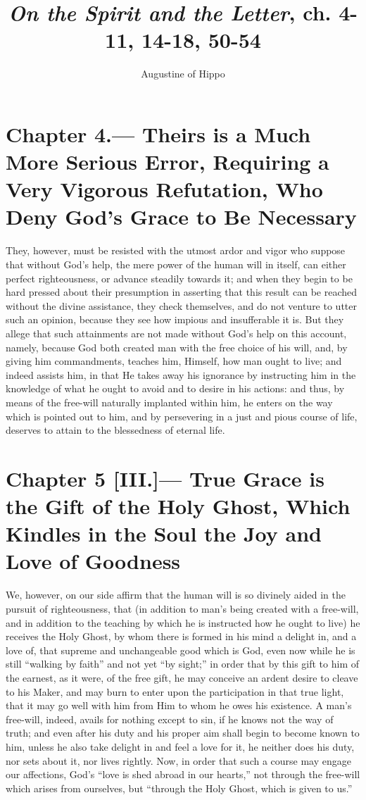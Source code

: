 \documentclass[10pt, twocolumn, oneside, a4paper]{memoir}
\title{\textit{On the Spirit and the Letter}, ch. 4-11, 14-18, 50-54}
\author{ Augustine of Hippo}
\date{}
\newcommand{\gloss}[1]{%
    \marginpar[\RaggedLeft \footnotesize{#1}]{\RaggedRight \footnotesize{#1}}}
\begin{document}
\maketitle
\section*{Chapter 4.— Theirs is a Much More Serious Error, Requiring a Very Vigorous Refutation, Who Deny God's Grace to Be Necessary}


They, however, must be resisted with the utmost ardor and vigor who suppose that without God's help, the mere power of the human will in itself, can either perfect righteousness, or advance steadily towards it; and when they begin to be hard pressed about their presumption in asserting that this result can be reached without the divine assistance, they check themselves, and do not venture to utter such an opinion, because they see how impious and insufferable it is. But they allege that such attainments are not made without God's help on this account, namely, because God both created man with the free choice of his will, and, by giving him commandments, teaches him, Himself, how man ought to live; and indeed assists him, in that He takes away his ignorance by instructing him in the knowledge of what he ought to avoid and to desire in his actions: and thus, by means of the free-will naturally implanted within him, he enters on the way which is pointed out to him, and by persevering in a just and pious course of life, deserves to attain to the blessedness of eternal life.
\section*{Chapter 5 [III.]— True Grace is the Gift of the Holy Ghost, Which Kindles in the Soul the Joy and Love of Goodness}


We, however, on our side affirm that the human will is so divinely aided in the pursuit of righteousness, that (in addition to man's being created with a free-will, and in addition to the teaching by which he is instructed how he ought to live) he receives the Holy Ghost, by whom there is formed in his mind a delight in, and a love of, that supreme and unchangeable good which is God, even now while he is still ``walking by faith'' and not yet ``by sight;'' \gloss{2 Corinthians 5:7} in order that by this gift to him of the earnest, as it were, of the free gift, he may conceive an ardent desire to cleave to his Maker, and may burn to enter upon the participation in that true light, that it may go well with him from Him to whom he owes his existence. A man's free-will, indeed, avails for nothing except to sin, if he knows not the way of truth; and even after his duty and his proper aim shall begin to become known to him, unless he also take delight in and feel a love for it, he neither does his duty, nor sets about it, nor lives rightly. Now, in order that such a course may engage our affections, God's ``love is shed abroad in our hearts,'' not through the free-will which arises from ourselves, but ``through the Holy Ghost, which is given to us.'' \gloss{Romans 5:5} 
\end{document}
